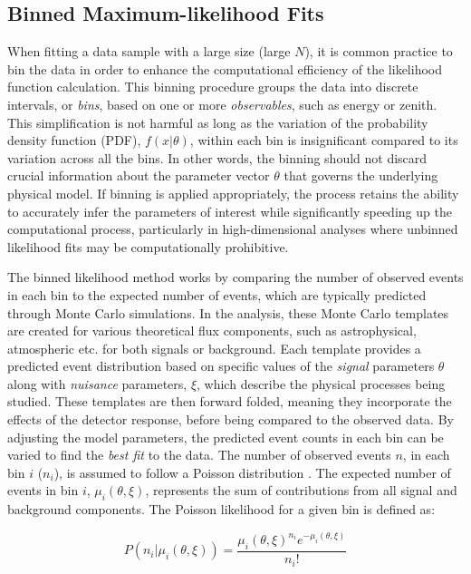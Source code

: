 \subsection{Binned Maximum-likelihood Fits}
\label{sec:MLE}
When fitting a data sample with a large size (large $N$), it is common practice to bin the data in order to enhance the computational efficiency of the likelihood function calculation. This binning procedure groups the data into discrete intervals, or \emph{bins}, based on one or more \emph{observables}, such as energy or zenith. This simplification is not harmful as long as the variation of the probability density function (PDF), $f(x|\theta)$, within each bin is insignificant compared to its variation across all the bins. In other words, the binning should not discard crucial information about the parameter vector $\theta$ that governs the underlying physical model. If binning is applied appropriately, the process retains the ability to accurately infer the parameters of interest while significantly speeding up the computational process, particularly in high-dimensional analyses where unbinned likelihood fits may be computationally prohibitive.

The binned likelihood method works by comparing the number of observed events in each bin to the expected number of events, which are typically predicted through Monte Carlo simulations. In the analysis, these Monte Carlo templates are created for various theoretical flux components, such as astrophysical, atmospheric etc. for both signals or background. Each template provides a predicted event distribution based on specific values of the \emph{signal} parameters $\theta$ along with \emph{nuisance} parameters, $\xi$, which describe the physical processes being studied. These templates are then forward folded, meaning they incorporate the effects of the detector response, before being compared to the observed data. By adjusting the model parameters, the predicted event counts in each bin can be varied to find the \emph{best fit} to the data. The number of observed events $n$, in each bin $i$ ($n_i$), is assumed to follow a Poisson distribution . The expected number of events in bin $i$, $\mu_i(\theta,\xi)$, represents the sum of contributions from all signal and background components. The Poisson likelihood for a given bin is defined as:

\begin{equation}\label{eq:Poisson}
    P(n_i|\mu_i(\theta,\xi)) = \frac{\mu_i(\theta,\xi)^{n_i} e^{-\mu_i(\theta,\xi)}}{n_i!}
\end{equation}

